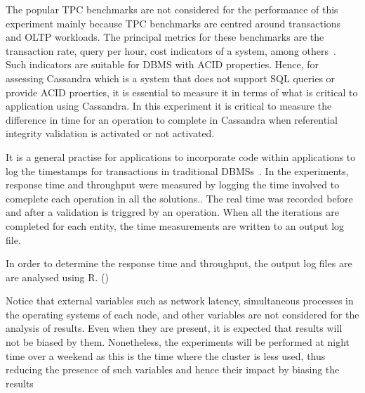 The popular TPC benchmarks are not considered for the performance of this
experiment mainly because TPC benchmarks are centred around transactions and
OLTP workloads. The principal metrics for these benchmarks are the
transaction rate, query per hour, cost indicators of a system, among
others~\citep{TPC}.
Such indicators are suitable for \ac{DBMS} with ACID properties. Hence, for
assessing Cassandra which is a system that does not support SQL queries or
provide ACID proerties, it is essential to measure it in terms of what is
critical to application  using Cassandra. In this experiment it is critical to
measure the difference in time for an operation to complete in Cassandra when
referential integrity validation is activated or not activated.



It is a general practise for applications to incorporate code within
applications to log the timestamps for transactions in traditional
\acp{DBMS}~\citep{IBMPerformance}.
In the experiments, response time and throughput were measured by logging the
time involved to comeplete each operation in all the solutions..
The real time was recorded before and after a validation is triggred by an
operation. When all the iterations are completed for each entity, the time
measurements are written to an output log file.

In order to determine the response time and throughput, the output log files are
are analysed using R. ()



Notice that external variables such as network latency, simultaneous processes
in the operating systems of each node, and other variables are not considered
for the analysis of results. Even when they are present, it is expected that
results will not be biased by them. Nonetheless, the experiments will be
performed at night time over a weekend as this is the time where the cluster is
less used, thus reducing the presence of such variables and hence their impact
by biasing the results 